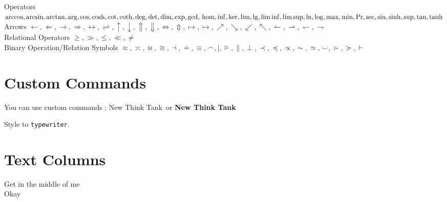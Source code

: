 \documentclass[a4paper,12pt]{book}
\newcommand{\NTT}{New Think Tank}
\newcommand{\NTTB}{\textbf{New Think Tank}}
\newcommand{\typew}[1]{\texttt{#1}}
\begin{document}
Operators $\arccos, \arcsin, \arctan, \arg, \cos, \cosh, \cot, \coth, \deg, 
\det, \dim, \exp, \gcd,\\ \hom, \inf, \ker, \lim, \lg, \liminf, \limsup, \ln, \log, 
\max, \min, \Pr, \sec, \sin, \sinh, \sup, \tan, \tanh$ \\
 
Arrows $\leftarrow, \Leftarrow, \rightarrow, \Rightarrow, \leftrightarrow, \rightleftharpoons,
 \uparrow, \downarrow, \Uparrow, \Downarrow, \Leftrightarrow, \Updownarrow, \mapsto, \longmapsto, 
 \nearrow, \searrow, \swarrow, \nwarrow, \leftharpoonup, \rightharpoonup, \leftharpoondown, \rightharpoondown$ \\
 
 Relational Operators $ \geq, \gg, \leq, \ll, \neq $ \\
 
Binary Operation/Relation Symbols $ \approx, \asymp, \bowtie, \cong, \dashv, \doteq, 
\equiv, \frown, \mid, \models, \parallel, \perp, \prec, \preceq, \propto, \sim, \simeq, \smile, 
\succ, \succeq, \vdash $ \\
 
 
 
\section{\textsf{Custom Commands}}
 
You can use custom commands : \NTT\ or \NTTB\
 
Style to \typew{typewriter}.
 
 
\section{\textsf{Text Columns}}
 
 
{\centering
Get in the middle of me\\
Okay\\[10pt]
}
 
 
 
 
 
\end{document}
